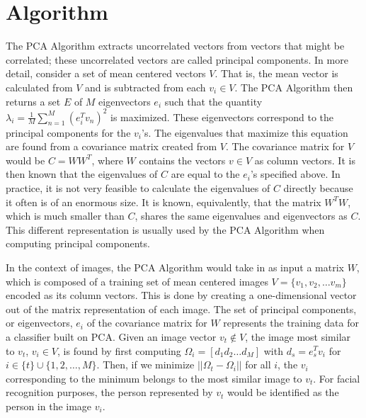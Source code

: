 \documentclass[letterpaper]{article}
\begin{document}
\section{Algorithm}
The PCA Algorithm extracts uncorrelated vectors from vectors
that might be correlated; these uncorrelated vectors are called
principal components. In more detail, consider a set of mean centered
vectors $V$. That is, the mean vector is calculated from $V$ and is subtracted from each $v_i \in V$. The PCA Algorithm then returns
a set $E$ of $M$ eigenvectors $e_i$ such that the quantity
\begin{math}
  \lambda_i = \frac{1}{M} \sum_{n=1}^{M}(e_{i}^{T} v_n)^2
\end{math}
is maximized. These eigenvectors correspond to the principal
components for the $v_i$'s. The eigenvalues that maximize this equation are found
from a covariance matrix created from $V$.  The covariance matrix for
$V$ would be $C=WW^T$, where $W$ contains the vectors $v \in V$ as
column vectors. It is then known that the eigenvalues of $C$ are equal to
the $e_i$'s specified above. In practice, it is not very feasible to 
calculate the eigenvalues of $C$ directly because it often is of an enormous size.
It is known, equivalently, that the matrix $W^T W$, which is much smaller than $C$,
shares the same eigenvalues and eigenvectors as $C$. This different representation
is usually used by the PCA Algorithm when computing principal components.

In the context of images, the PCA Algorithm would take in as input a
matrix $W$, which is composed of a training set of mean centered images $V = \{v_1, v_2, \ldots
v_m\}$ encoded as
its column vectors.  This is done by creating a one-dimensional vector
out of the matrix representation of each image. The set of principal
components, or eigenvectors, $e_i$ of the covariance matrix for $W$
represents the training data for a classifier built on PCA.  Given an
image vector $v_t \notin V$, the image most similar to $v_t$, $v_i \in V$, is found by first
computing
\begin{math}
  \Omega_i = \left[ d_1 d_2 \ldots d_M \right]
\end{math} 
with $d_s = e_s^T v_i$ for $i \in \{t\} \cup \{1, 2, \ldots, M \}$. Then, if we minimize
\begin{math}
\left| \left| \Omega_t - \Omega_i \right| \right|
\end{math}
for all $i$, the $v_i$ corresponding to the minimum belongs to the
most similar image to $v_t$. For facial recognition purposes, the 
person represented by $v_t$ would be identified as the person in the
image $v_i$.
\end{document}
